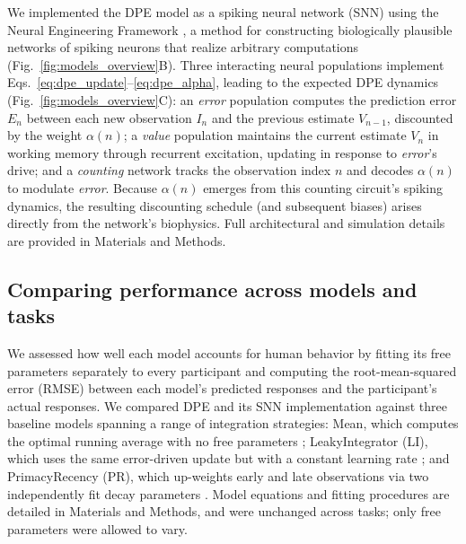 \documentclass[12pt]{article}
\begin{document}
We implemented the DPE model as a spiking neural network (SNN) using the Neural Engineering Framework \cite{eliasmith2003neural}, a method for constructing biologically plausible networks of spiking neurons that realize arbitrary computations (Fig.~\ref{fig:models_overview}B). Three interacting neural populations implement Eqs.~\ref{eq:dpe_update}--\ref{eq:dpe_alpha}, leading to the expected DPE dynamics (Fig.~\ref{fig:models_overview}C): an \textit{error} population computes the prediction error $E_n$ between each new observation $I_n$ and the previous estimate $V_{n-1}$, discounted by the weight $\alpha(n)$; a \textit{value} population maintains the current estimate $V_n$ in working memory through recurrent excitation, updating in response to \textit{error}'s drive; and a \textit{counting} network tracks the observation index $n$ and decodes $\alpha(n)$ to modulate \textit{error}. Because $\alpha(n)$ emerges from this counting circuit's spiking dynamics, the resulting discounting schedule (and subsequent biases) arises directly from the network's biophysics. Full architectural and simulation details are provided in Materials and Methods.

\subsection{Comparing performance across models and tasks}
We assessed how well each model accounts for human behavior by fitting its free parameters separately to every participant and computing the root-mean-squared error (RMSE) between each model's predicted responses and the participant's actual responses. We compared DPE and its SNN implementation against three baseline models spanning a range of integration strategies: Mean, which computes the optimal running average with no free parameters \cite{degroot1974reaching}; LeakyIntegrator (LI), which uses the same error-driven update but with a constant learning rate \cite{usher2001time, glaze2015normative}; and PrimacyRecency (PR), which up-weights early and late observations via two independently fit decay parameters \cite{pooley2011understanding, galdo2022quest, yoo2025people}. Model equations and fitting procedures are detailed in Materials and Methods, and were unchanged across tasks; only free parameters were allowed to vary.
\end{document}

